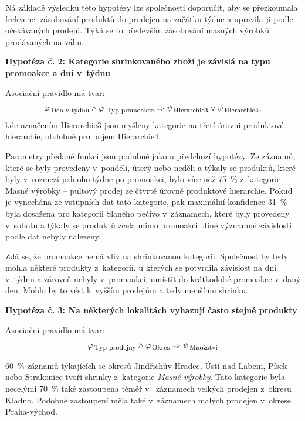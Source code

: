 Ná základě výsledků této hypotézy lze společnosti doporučit, aby se přezkoumala frekvenci zásobování produktů do prodejen na začátku týdne a upravila ji podle očekávaných prodejů. Týká se to především zásobování masných výrobků prodávaných na váhu.

\vspace*{1em}

\textbf{Hypotéza č. 2: Kategorie shrinkovaného zboží je závislá na typu promoakce a dni v~týdnu}

Asociační pravidlo má tvar:
\begin{equation}
    \varphi_{\mbox{\,\footnotesize Den v~týdnu}} \land \varphi_{\,\mbox{\,\footnotesize Typ promoakce}} \Rightarrow \psi_{\mbox{\,\footnotesize Hierarchie3}} \lor \psi_{\mbox{\,\footnotesize Hierarchie4}},
\end{equation}
kde označením Hierarchie3 jsou myšleny kategorie na třetí úrovni produktové hierarchie, obdobně pro pojem Hierarchie4.

Parametry předané funkci jsou podobné jako u předchozí hypotézy. Ze záznamů, které se byly provedeny v~pondělí, úterý nebo neděli a týkaly se produktů, které byly v~rozmezí  jednoho týdne po promoakci, bylo více než 75~\% z~kategorie Masné výrobky -- pultový prodej ze čtvrté úrovně produktové hierarchie. Pokud je vynechána ze vstupních dat tato kategorie, pak maximální konfidence 31~\% byla dosažena pro kategorii Slaného pečivo v~záznamech, které byly provedeny v~sobotu a týkaly se produktů zcela mimo promoakci. Jiné významné závislosti podle dat nebyly nalezeny.

Zdá se, že promoakce nemá vliv na shrinkovanou kategorii. Společnost by tedy mohla některé produkty z~kategorií, u kterých se potvrdila závislost na dni v~týdnu a zároveň nebyly v~promoakci, umístit do krátkodobé promoakce v~daný den. Mohlo by to vést k~vyšším prodejům a tedy menšímu shrinku.

\vspace*{1em}

\textbf{Hypotéza č. 3: Na některých lokalitách vyhazují často stejné produkty}

Asociační pravidlo má tvar:
\begin{equation}
    \varphi_{\mbox{\,\footnotesize Typ prodejny}} \land \varphi_{\,\mbox{\footnotesize Okres}} \Rightarrow \psi_{\mbox{\,\footnotesize Množství}}
\end{equation}

60~\% záznamů týkajících se okresů Jindřichův Hradec, Ústí nad Labem, Písek nebo Strakonice tvoří shrinky z~kategorie \emph{Masné výrobky}. Tato kategorie byla necelými 70~\% také zastoupena téměř
 v~ záznamech velkých prodejen z~okresu Kladno. Podobné zastoupení měla také v~záznamech malých prodejen v~okrese Praha-východ.

